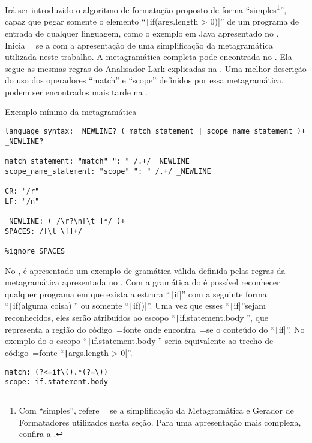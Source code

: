 Irá ser introduzido o algoritmo de formatação proposto de forma ``simples\footnote{
Com ``simples'',
refere~=se a simplificação da Metagramática e
Gerador de Formatadores utilizados nesta seção.
Para uma apresentação mais complexa,
confira a .
}'',
capaz que pegar somente o elemento ``\texttt|if(args.length > 0)|'' de um programa de entrada de qualquer linguagem,
como o exemplo em Java apresentado no .
Inicia~=se a com a apresentação de uma simplificação da metagramática utilizada neste trabalho.
A metagramática completa pode encontrada no .
Ela segue as mesmas regras do Analisador Lark explicadas na .
Uma melhor descrição do uso dos operadores ``match'' e
``scope'' definidos por essa metagramática,
podem ser encontrados mais tarde na .
\begin{code}
\caption{Exemplo mínimo da metagramática}
\label{code:exemploMinimoDeMetagramatica}
\begin{verbatim}
language_syntax: _NEWLINE? ( match_statement | scope_name_statement )+ _NEWLINE?

match_statement: "match" ": " /.+/ _NEWLINE
scope_name_statement: "scope" ": " /.+/ _NEWLINE

CR: "/r"
LF: "/n"

_NEWLINE: ( /\r?\n[\t ]*/ )+
SPACES: /[\t \f]+/

%ignore SPACES
\end{verbatim}
\end{code}

No ,
é apresentado um exemplo de gramática válida definida pelas regras da metagramática apresentada no .
Com a gramática do  é possível reconhecer qualquer programa em que exista a estrura ``\texttt|if|'' com a seguinte forma ``\texttt|if(alguma coisa)|'' ou
somente ``\texttt|if()|''.
Uma vez que esses ``\texttt|if|''\s sejam reconhecidos,
eles serão atribuídos ao escopo ``\texttt|if.statement.body|'',
que representa a região do código~=fonte onde encontra~=se o conteúdo do ``\texttt|if|''.
No exemplo do  o escopo ``\texttt|if.statement.body|'' seria equivalente ao trecho de código~=fonte ``\texttt|args.length > 0|''.
\begin{lstlisting}[caption={Exemplo de gramática pelas regras da mínima metagramática},label={code:exemploDeGramaticaPelasRegrasDaMetagramatica},style=yaml_style]
match: (?<=if\().*(?=\))
scope: if.statement.body
\end{lstlisting}

